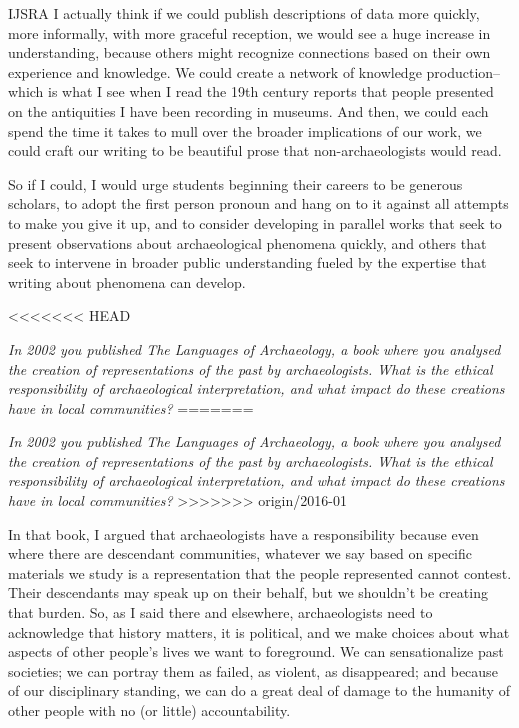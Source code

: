 \begin{labeling}{IJSRA}
I actually think if we could publish descriptions of data more quickly, more informally, with more graceful reception, we would see a huge increase in understanding, because others might recognize connections based on their own experience and knowledge. We could create a network of knowledge production-- which is what I see when I read the 19th century reports that people presented on the antiquities I have been recording in museums. And then, we could each spend the time it takes to mull over the broader implications of our work, we could craft our writing to be beautiful prose that non-archaeologists would read.

So if I could, I would urge students beginning their careers to be generous scholars, to adopt the first person pronoun and hang on to it against all attempts to make you give it up, and to consider developing in parallel works that seek to present observations about archaeological phenomena quickly, and others that seek to intervene in broader public understanding fueled by the expertise that writing about phenomena can develop.

<<<<<<< HEAD
\item[IJSRA] \emph{In 2002 you published \emph{The Languages of Archaeology}, a book where you analysed the creation of representations of the past by archaeologists. What is the ethical responsibility of archaeological interpretation, and what impact do these creations have in local communities?} 
=======
\item[IJSRA] \textit{In 2002 you published \emph{The Languages of Archaeology}, a book where you analysed the creation of representations of the past by archaeologists. What is the ethical responsibility of archaeological interpretation, and what impact do these creations have in local communities?} 
>>>>>>> origin/2016-01

\item[RAJ] In that book, I argued that archaeologists have a responsibility because even where there are descendant communities, whatever we say based on specific materials we study is a representation that the people represented cannot contest. Their descendants may speak up on their behalf, but we shouldn't be creating that burden. So, as I said there and elsewhere, archaeologists need to acknowledge that history matters, it is political, and we make choices about what aspects of other people's lives we want to foreground. We can sensationalize past societies; we can portray them as failed, as violent, as disappeared; and because of our disciplinary standing, we can do a great deal of damage to the humanity of other people with no (or little) accountability.


\end{labeling}
